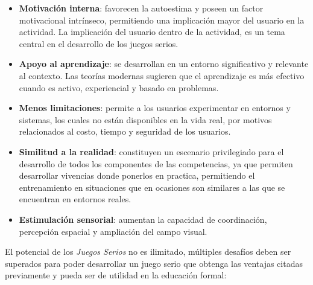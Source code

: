 \begin{itemize}

\item \textbf{Motivación interna}: favorecen la autoestima y poseen un factor
    motivacional intrínseco\cite{guenaga2013serious,martin2008model}, permitiendo una implicación mayor del
    usuario en la actividad\cite{sg:aoverview}. La implicación del usuario
    dentro de la actividad, es un tema central en el desarrollo de los juegos
    serios\cite{charsky:2010}.

\item \textbf{Apoyo al aprendizaje}: se desarrollan en un entorno significativo y relevante al
    contexto\cite{sg:aoverview}. Las teorías modernas sugieren
    que el aprendizaje es más efectivo cuando es activo, experiencial y basado
    en problemas\cite{guenaga2013serious}.

\item \textbf{Menos limitaciones}: permite a los usuarios experimentar en entornos 
	y sistemas, los cuales 
    no están disponibles en la vida real, por motivos relacionados al 
    costo, tiempo y seguridad de los usuarios\cite{sg:aoverview}.
    
\item \textbf{Similitud a la realidad}: constituyen un escenario privilegiado
    para el desarrollo de todos los componentes de las competencias, ya que
    permiten desarrollar vivencias donde ponerlos en practica, permitiendo
    el entrenamiento en situaciones que en ocasiones son similares a las
    que se encuentran en entornos reales\cite{guenaga2013serious,sg:aoverview}.
    
\item \textbf{Estimulación sensorial}: aumentan la capacidad de coordinación,
    percepción espacial y ampliación del campo visual\cite{guenaga2013serious}. 

\end{itemize}

El potencial de los \emph{Juegos Serios} no es ilimitado, múltiples desafíos deben ser
superados para poder desarrollar un juego serio que obtenga las ventajas citadas
previamente y pueda ser de utilidad en la educación formal:


